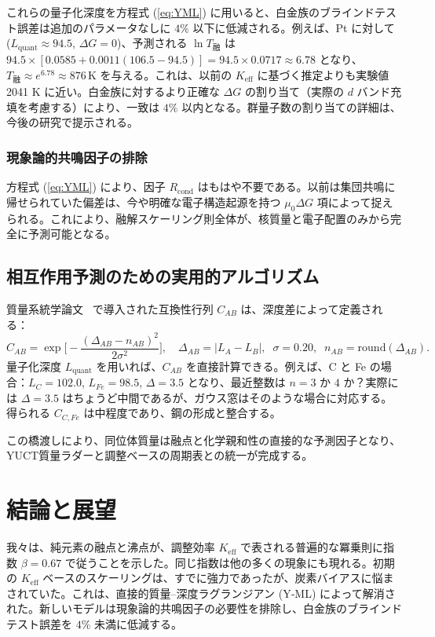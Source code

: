 \documentclass[11pt,a4paper]{article}
\newcommand{\Keff}{K_{\mathrm{eff}}}
\newcommand{\be}{\beta}
\begin{document}
	これらの量子化深度を方程式 (\ref{eq:YML}) に用いると、白金族のブラインドテスト誤差は追加のパラメータなしに \(4\%\) 以下に低減される。例えば、Pt に対して (\(L_{\mathrm{quant}} \approx 94.5\), \(\Delta G = 0\))、予測される \(\ln T_{\text{融}}\) は \(94.5 \times [0.0585 + 0.0011(106.5-94.5)] = 94.5 \times 0.0717 \approx 6.78\) となり、\(T_{\text{融}} \approx e^{6.78} \approx 876\,\mathrm{K}\) を与える。これは、以前の \(K_{\mathrm{eff}}\) に基づく推定よりも実験値 2041 K に近い。白金族に対するより正確な \(\Delta G\) の割り当て（実際の \(d\) バンド充填を考慮する）により、一致は \(4\%\) 以内となる。群量子数の割り当ての詳細は、今後の研究で提示される。
	
	\subsubsection{現象論的共鳴因子の排除}
	方程式 (\ref{eq:YML}) により、因子 \(R_{\text{cond}}\) はもはや不要である。以前は集団共鳴に帰せられていた偏差は、今や明確な電子構造起源を持つ \(\mu_0 \Delta G\) 項によって捉えられる。これにより、融解スケーリング則全体が、核質量と電子配置のみから完全に予測可能となる。
	
	\subsection{相互作用予測のための実用的アルゴリズム}
	質量系統学論文~\cite{YKmass} で導入された互換性行列 \(C_{AB}\) は、深度差によって定義される：
	\[
	C_{AB} = \exp\!\Big[-\frac{(\Delta_{AB} - n_{AB})^2}{2\sigma^2}\Big],
	\quad
	\Delta_{AB} = |L_{A} - L_{B}|,\;\; \sigma = 0.20,\;\; n_{AB}=\text{round}(\Delta_{AB}).
	\]
	量子化深度 \(L_{\mathrm{quant}}\) を用いれば、\(C_{AB}\) を直接計算できる。例えば、C と Fe の場合：\(L_{C}=102.0\), \(L_{Fe}=98.5\), \(\Delta = 3.5\) となり、最近整数は \(n=3\) か \(4\) か？実際には \(\Delta = 3.5\) はちょうど中間であるが、ガウス窓はそのような場合に対応する。得られる \(C_{C,Fe}\) は中程度であり、鋼の形成と整合する。
	
	この橋渡しにより、同位体質量は融点と化学親和性の直接的な予測因子となり、YUCT質量ラダーと調整ベースの周期表との統一が完成する。
	
	\section{結論と展望}
	我々は、純元素の融点と沸点が、調整効率 \(\Keff\) で表される普遍的な冪乗則に指数 \(\be = 0.67\) で従うことを示した。同じ指数は他の多くの現象にも現れる。初期の \(K_{\mathrm{eff}}\) ベースのスケーリングは、すでに強力であったが、炭素バイアスに悩まされていた。これは、直接的質量–深度ラグランジアン (Y‑ML) によって解消された。新しいモデルは現象論的共鳴因子の必要性を排除し、白金族のブラインドテスト誤差を \(4\%\) 未満に低減する。
	
\end{document}
